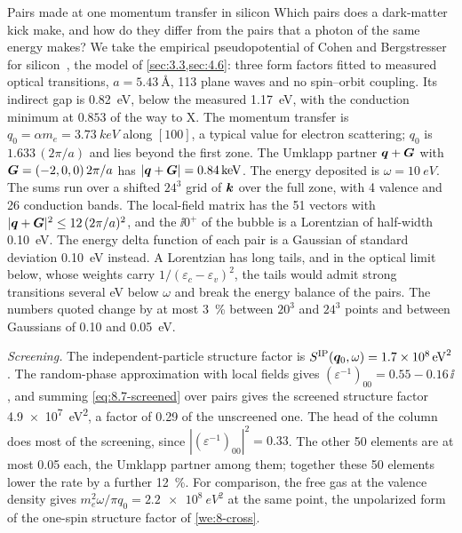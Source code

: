 \begin{workedexample}{Pairs made at one momentum transfer in silicon}\label{we:8-pairs}
Which pairs does a dark-matter kick make, and how do they differ from the pairs that a photon of the same energy makes? We take the empirical pseudopotential of Cohen and Bergstresser for silicon~\cite{cohen1966band}, the model of \cref{sec:3.3,sec:4.6}: three form factors fitted to measured optical transitions, $a = \SI{5.43}{\angstrom}$, 113 plane waves and no spin--orbit coupling. Its indirect gap is \SI{0.82}{eV}, below the measured \SI{1.17}{eV}, with the conduction minimum at $0.853$ of the way to X. The momentum transfer is $q_0 = \alpha m_e = \SI{3.73}{keV}$ along $[100]$, a typical value for electron scattering; $q_0$ is $1.633\,(2\pi/a)$ and lies beyond the first zone. The Umklapp partner $\bm{q} + \bm{G}$ with $\bm{G} = (-2,0,0)\,2\pi/a$ has $|\bm{q}+\bm{G}| = \SI{0.84}{keV}$. The energy deposited is $\omega = \SI{10}{eV}$. The sums run over a shifted $24^3$ grid of $\bm{k}$ over the full zone, with 4 valence and 26 conduction bands. The local-field matrix has the 51 vectors with $|\bm{q}+\bm{G}|^2 \le 12\,(2\pi/a)^2$, and the $\ii0^+$ of the bubble is a Lorentzian of half-width \SI{0.10}{eV}. The energy delta function of each pair is a Gaussian of standard deviation \SI{0.10}{eV} instead. A Lorentzian has long tails, and in the optical limit below, whose weights carry $1/(\varepsilon_c - \varepsilon_v)^2$, the tails would admit strong transitions several eV below $\omega$ and break the energy balance of the pairs. The numbers quoted change by at most \SI{3}{\percent} between $20^3$ and $24^3$ points and between Gaussians of 0.10 and \SI{0.05}{eV}.

\emph{Screening.} The independent-particle structure factor is $S^{\mathrm{IP}}(\bm{q}_0,\omega) = \SI{1.7e8}{eV^2}$. The random-phase approximation with local fields gives $(\varepsilon^{-1})_{00} = 0.55 - 0.16\,\ii$, and summing \cref{eq:8.7-screened} over pairs gives the screened structure factor \SI{4.9e7}{eV^2}, a factor of 0.29 of the unscreened one. The head of the column does most of the screening, since $|(\varepsilon^{-1})_{00}|^2 = 0.33$. The other 50 elements are at most 0.05 each, the Umklapp partner among them; together these 50 elements lower the rate by a further \SI{12}{\percent}. For comparison, the free gas at the valence density gives $m_e^2\omega/\pi q_0 = \SI{2.2e8}{eV^2}$ at the same point, the unpolarized form of the one-spin structure factor of \cref{we:8-cross}.


\end{workedexample}
